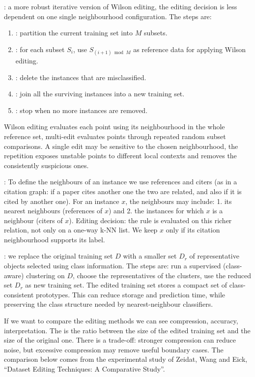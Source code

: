 : a more robust iterative version of Wilson editing, the editing decision is less dependent on one single neighbourhood configuration. The steps are:
\begin{enumerate}
    \item {}: partition the current training set into $M$ subsets.
    \item {}: for each subset $S_i$, use $S_{(i+1)\bmod M}$ as reference data for applying Wilson editing.
    \item {}: delete the instances that are misclassified.
    \item {}: join all the surviving instances into a new training set.
    \item {}: stop when no more instances are removed.
\end{enumerate}
Wilson editing evaluates each point using its neighbourhood in the whole reference set, multi-edit evaluates points through repeated random subset comparisons. A single edit may be sensitive to the chosen neighbourhood, the repetition exposes unstable points to different local contexts and removes the consistently suspicious ones.

: To define the neighbours of an instance we use references and citers (as in a citation graph: if a paper cites another one the two are related, and also if it is cited by another one). For an instance $x$, the neighbours may include: 1. its nearest neighbours (references of $x$) and 2. the instances for which $x$ is a neighbour (citers of $x$).
Editing decision: the rule is evaluated on this richer relation, not only on a one-way k-NN list. We keep $x$ only if its citation neighbourhood supports its label.

: we replace the original training set $D$ with a smaller set $D_r$ of representative objects selected using class information. The steps are: run a supervised (class-aware) clustering on $D$, choose the representatives of the clusters, use the reduced set $D_r$ as new training set. The edited training set stores a compact set of class-consistent prototypes. This can reduce storage and prediction time, while preserving the class structure needed by nearest-neighbour classifiers.

If we want to compare the editing methods we can see compression, accuracy, interpretation. The  is the ratio between the size of the edited training set and the size of the original one. There is a trade-off: stronger compression can reduce noise, but excessive compression may remove useful boundary cases. The comparison below comes from the experimental study of Zeidat, Wang and Eick, ``Dataset Editing Techniques: A Comparative Study''.

